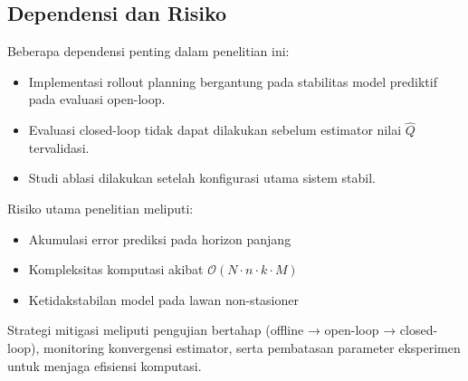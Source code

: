\subsection{Dependensi dan Risiko}

Beberapa dependensi penting dalam penelitian ini:

\begin{itemize}
    \item Implementasi rollout planning bergantung pada stabilitas model prediktif pada evaluasi open-loop.
    \item Evaluasi closed-loop tidak dapat dilakukan sebelum estimator nilai $\hat{Q}$ tervalidasi.
    \item Studi ablasi dilakukan setelah konfigurasi utama sistem stabil.
\end{itemize}

Risiko utama penelitian meliputi:

\begin{itemize}
    \item Akumulasi error prediksi pada horizon panjang
    \item Kompleksitas komputasi akibat $\mathcal{O}(N \cdot n \cdot k \cdot M)$
    \item Ketidakstabilan model pada lawan non-stasioner
\end{itemize}

Strategi mitigasi meliputi pengujian bertahap (offline → open-loop → closed-loop),
monitoring konvergensi estimator, serta pembatasan parameter eksperimen
untuk menjaga efisiensi komputasi.

